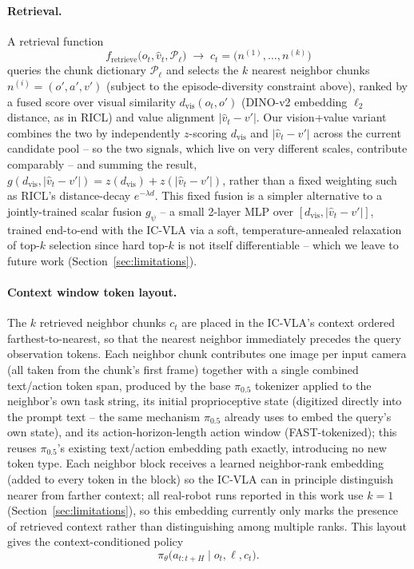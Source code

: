 \paragraph{Retrieval.} A retrieval function
\begin{equation}
    f_{\text{retrieve}}\big(o_t, \hat{v}_t, \mathcal{P}_\ell\big) \;\rightarrow\;
    c_t = \big(n^{(1)}, \dots, n^{(k)}\big)
    \label{eq:retrieval-fn}
\end{equation}
queries the chunk dictionary $\mathcal{P}_\ell$ and selects the $k$ nearest neighbor
chunks $n^{(i)} = (o', a', v')$ (subject to the episode-diversity constraint above),
ranked by a fused score over visual similarity $d_{\text{vis}}(o_t, o')$ (DINO-v2
embedding $\ell_2$ distance, as in RICL) and value alignment $|\hat{v}_t - v'|$. Our
vision+value \method variant combines the two by independently $z$-scoring
$d_{\text{vis}}$ and $|\hat{v}_t - v'|$ across the current candidate pool -- so the
two signals, which live on very different scales, contribute comparably -- and
summing the result, $g(d_{\text{vis}}, |\hat v_t - v'|) = z(d_{\text{vis}}) +
z(|\hat v_t - v'|)$, rather than a fixed weighting such as RICL's distance-decay
$e^{-\lambda d}$. This fixed fusion is a simpler alternative to a jointly-trained
scalar fusion $g_\psi$ -- a small 2-layer MLP over $[d_{\text{vis}}, |\hat v_t -
v'|]$, trained end-to-end with the IC-VLA via a soft, temperature-annealed
relaxation of top-$k$ selection since hard top-$k$ is not itself differentiable --
which we leave to future work (Section~\ref{sec:limitations}).

\paragraph{Context window token layout.} The $k$ retrieved neighbor chunks $c_t$ are
placed in the IC-VLA's context ordered farthest-to-nearest, so that the nearest
neighbor immediately precedes the query observation tokens. Each neighbor chunk
contributes one image per input camera (all taken from the chunk's first frame)
together with a single combined text/action token span, produced by the base
$\pi_{0.5}$ tokenizer applied to the neighbor's own task string, its initial
proprioceptive state (digitized directly into the prompt text -- the same mechanism
$\pi_{0.5}$ already uses to embed the query's own state), and its
action-horizon-length action window (FAST-tokenized); this reuses $\pi_{0.5}$'s
existing text/action embedding path exactly, introducing no new token type. Each
neighbor block receives a learned neighbor-rank embedding (added to every token in
the block) so the IC-VLA can in principle distinguish nearer from farther context;
all real-robot runs reported in this work use $k=1$ (Section~\ref{sec:limitations}),
so this embedding currently only marks the presence of retrieved context rather than
distinguishing among multiple ranks. This layout gives the context-conditioned
policy
\begin{equation}
    \pi_\theta\big(a_{t:t+H} \mid o_t, \ell, c_t\big) .
    \label{eq:ic-vla-policy}
\end{equation}

